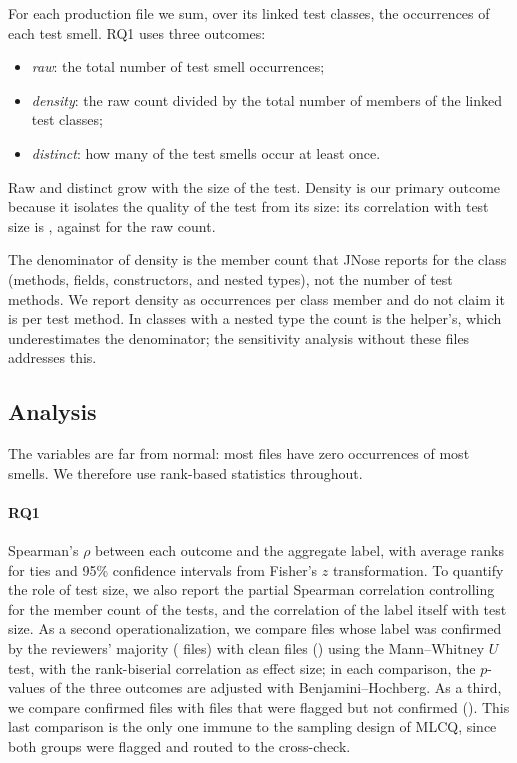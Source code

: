 For each production file we sum, over its linked test classes, the occurrences of each
test smell. RQ1 uses three outcomes:

\begin{itemize}
  \item \emph{raw}: the total number of test smell occurrences;
  \item \emph{density}: the raw count divided by the total number of members of the linked
  test classes;
  \item \emph{distinct}: how many of the \FsmellsHabilitados{} test smells occur at least
  once.
\end{itemize}

Raw and distinct grow with the size of the test. Density is our primary outcome because
it isolates the quality of the test from its size: its correlation with test size is
\FrhoDensidadeTamanho{}, against \FrhoBrutoTamanho{} for the raw count.

The denominator of density is the member count that JNose reports for the class
(methods, fields, constructors, and nested types), not the number of test methods. We
report density as occurrences per class member and do not claim it is per test method.
In classes with a nested type the count is the helper's, which underestimates the
denominator; the sensitivity analysis without these files addresses this.

\subsection{Analysis}
\label{sec:analysis}

The variables are far from normal: most files have zero occurrences of most smells. We
therefore use rank-based statistics throughout.

\paragraph{RQ1}
Spearman's $\rho$ between each outcome and the aggregate label, with average ranks for
ties and 95\% confidence intervals from Fisher's $z$ transformation. To quantify the role of test size, we also
report the partial Spearman correlation controlling for the member count of the tests,
and the correlation of the label itself with test size. As a second operationalization,
we compare files whose label was confirmed by the reviewers' majority
(\FnConfirmados{} files) with clean files (\FnLimpos{}) using the Mann--Whitney $U$ test,
with the rank-biserial correlation as effect size; in each comparison, the $p$-values of the
three outcomes are adjusted with Benjamini--Hochberg. As a third, we compare confirmed files
with files that were flagged but not confirmed (\FnDisputados{}). This last comparison is
the only one immune to the sampling design of MLCQ, since both groups were flagged and
routed to the cross-check.

